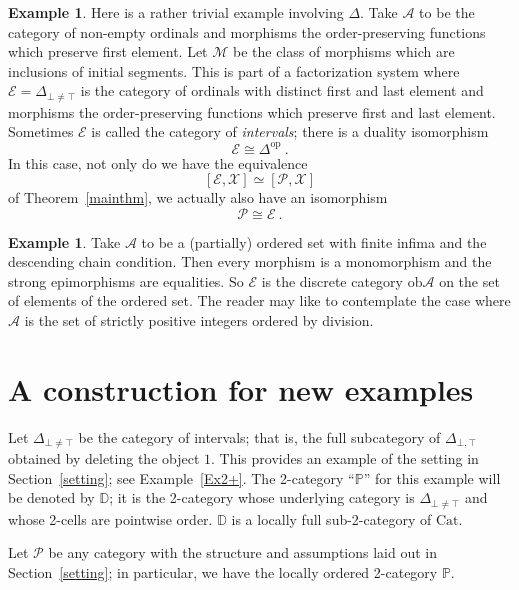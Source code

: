 \documentclass[a4paper,12pt,reqno]{amsart}
\theoremstyle{definition}
\newtheorem{example}[theorem]{Example}
\theoremstyle{fact}
\theoremstyle{genquest}
\theoremstyle{step}
\def\CA{{\mathscr A}}
\def\CE{{\mathscr E}}
\def\CM{{\mathscr M}}
\def\CP{{\mathscr P}}
\def\CX{{\mathscr X}}
\begin{document}
\begin{example}
Here is a rather trivial example involving $\Delta$.
Take $\CA$ to be the category of non-empty ordinals and morphisms
the order-preserving functions which preserve first element.
Let $\CM$ be the class of morphisms which are inclusions of
initial segments. This is part of a factorization system where
$\CE = \Delta_{\bot \neq \top}$ is the category of ordinals with 
distinct first and last element 
and morphisms the order-preserving functions which preserve first 
and last element. Sometimes $\CE$ is called the category of {\em intervals}; there is a duality isomorphism
$$\CE \cong \Delta^{\mathrm{op}} \ .$$ 
In this case, not only do we have the equivalence
$$[\CE, \CX] \simeq [\CP, \CX] $$
of Theorem~\ref{mainthm}, we actually also have an isomorphism
$$\CP \cong \CE \ .$$
\end{example}

\begin{example}
Take $\CA$ to be a (partially) ordered set with finite infima and the descending chain condition. 
Then every morphism is a monomorphism
and the strong epimorphisms are equalities. So $\CE$ is
the discrete category $\mathrm{ob}\CA$ on the set of
elements of the ordered set. The reader may like to contemplate
the case where $\CA$ is the set of strictly positive integers
ordered by division. 
\end{example}

\section{A construction for new examples}\label{egconst}

Let $\Delta_{\bot \neq \top}$ be the category of intervals; that is, the full subcategory of 
$\Delta_{\bot, \top}$ obtained by deleting the object $1$. 
This provides an example of the setting in Section~\ref{setting}; see Example~\ref{Ex2+}.
The 2-category ``$\mathbb{P}$'' for this example will be denoted by $\mathbb{D}$; 
it is the 2-category whose underlying category is $\Delta_{\bot \neq \top}$ 
and whose 2-cells are pointwise order. 
$\mathbb{D}$ is a locally full sub-2-category of $\mathrm{Cat}$.  

Let $\CP$ be any category with the structure and assumptions laid out in Section~\ref{setting}; in particular, we have the locally ordered 2-category $\mathbb{P}$. 
\end{document}
